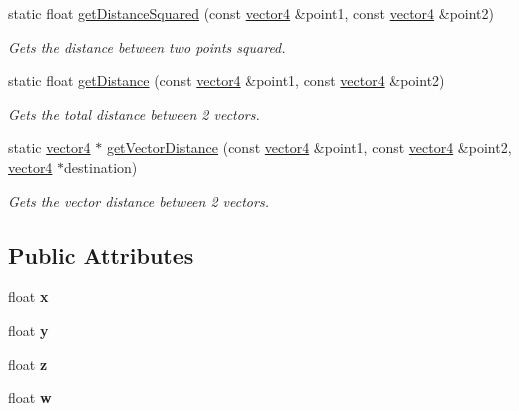 \begin{DoxyCompactItemize}
static float \hyperlink{classflounder_1_1vector4_a09dce41520478186f5afd2bef8290776}{get\+Distance\+Squared} (const \hyperlink{classflounder_1_1vector4}{vector4} \&point1, const \hyperlink{classflounder_1_1vector4}{vector4} \&point2)
\begin{DoxyCompactList}\small\item\em Gets the distance between two points squared. \end{DoxyCompactList}\item 
static float \hyperlink{classflounder_1_1vector4_a24128e65e05cc5430c905349b859dfc1}{get\+Distance} (const \hyperlink{classflounder_1_1vector4}{vector4} \&point1, const \hyperlink{classflounder_1_1vector4}{vector4} \&point2)
\begin{DoxyCompactList}\small\item\em Gets the total distance between 2 vectors. \end{DoxyCompactList}\item 
static \hyperlink{classflounder_1_1vector4}{vector4} $\ast$ \hyperlink{classflounder_1_1vector4_a211be3c7da1bdc5a2b71661b291e140d}{get\+Vector\+Distance} (const \hyperlink{classflounder_1_1vector4}{vector4} \&point1, const \hyperlink{classflounder_1_1vector4}{vector4} \&point2, \hyperlink{classflounder_1_1vector4}{vector4} $\ast$destination)
\begin{DoxyCompactList}\small\item\em Gets the vector distance between 2 vectors. \end{DoxyCompactList}\end{DoxyCompactItemize}
\subsection*{Public Attributes}
\begin{DoxyCompactItemize}
\item 
\mbox{\label{classflounder_1_1vector4_affb861c081e42dbb5c2f63ecf4f07bb9}} 
float {\bfseries x}
\item 
\mbox{\label{classflounder_1_1vector4_a7dd1786ca39496a55ef6c4244020aa3b}} 
float {\bfseries y}
\item 
\mbox{\label{classflounder_1_1vector4_acff3319d224de3df57866b985291a398}} 
float {\bfseries z}
\item 
\mbox{\label{classflounder_1_1vector4_ad4e06ca3f8c633a0b7422559a9d1f8bd}} 
float {\bfseries w}
\end{DoxyCompactItemize}


